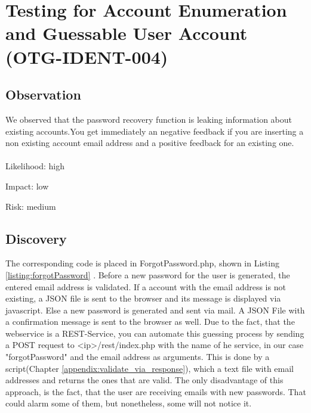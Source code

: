 \chapter{Testing for Account Enumeration and Guessable User Account (OTG-IDENT-004)}
\section{Observation}
We observed that the password recovery function is leaking information about existing accounts.You get immediately an negative feedback if you are inserting a non existing account email address and a positive feedback for an existing  one.
\\
\\
Likelihood: high \newline

Impact: low\newline

Risk: medium\newline

\section{Discovery}

The corresponding code is placed in ForgotPassword.php, shown in Listing \ref{listing:forgotPassword} . Before a new password for the user is generated, the entered email address is validated.  If a account with the email address is not existing, a JSON file is sent to the browser and its message is displayed via javascript. Else a new password is generated and sent via mail. A JSON File with a confirmation message is sent to the browser as well. Due to the fact, that the webservice is a REST-Service, you can automate this guessing process by sending a POST request to <ip>/rest/index.php with the name of he service, in our case "forgotPassword" and the email address as arguments. This is done by a script(Chapter \ref{appendix:validate_via_response}), which a text file with email addresses and returns the ones that are valid. The only disadvantage of this approach, is the fact, that the user are receiving emails with new passwords. That could alarm some of them, but nonetheless, some will not notice it.

